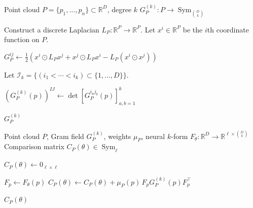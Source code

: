 \documentclass{article}
\theoremstyle{remark}
\theoremstyle{plain}
\begin{document}
\begin{algorithm}[H]
\caption{Gram field precomputation}
\label{alg:gram-field}
\begin{algorithmic}[1]
\Require Point cloud $P=\{p_1,\ldots,p_n\}\subset\mathbb{R}^D$, degree $k$
\Ensure $G_P^{(k)}:P\to\operatorname{Sym}_{\binom{D}{k}}$

\State Construct a discrete Laplacian $L_P:\mathbb{R}^P\to\mathbb{R}^P$.
\State Let $x^i\in\mathbb{R}^P$ be the $i$th coordinate function on $P$.

    \State $G_P^{ij}\gets
    \frac{1}{2}\left(
    x^i\odot L_Px^j+x^j\odot L_Px^i-L_P(x^i\odot x^j)
    \right)$
\EndFor

\State Let $\mathcal{I}_k=\{(i_1<\cdots<i_k)\subset\{1,\ldots,D\}\}$.

        \State $\left(G_P^{(k)}(p)\right)^{IJ}
        \gets
        \det\left[G_P^{i_a j_b}(p)\right]_{a,b=1}^k$
    \EndFor
\EndFor

\State \Return $G_P^{(k)}$
\end{algorithmic}
\end{algorithm}


\begin{algorithm}[H]
\caption{Comparison matrix forward pass}
\label{alg:comparison-matrix}
\begin{algorithmic}[1]
\Require Point cloud $P$, Gram field $G_P^{(k)}$, weights $\mu_P$, neural $k$-form $F_\theta:\mathbb{R}^D\to
\mathbb{R}^{\ell\times\binom{D}{k}}$
\Ensure Comparison matrix $C_P(\theta)\in\operatorname{Sym}_{\ell}$

\State $C_P(\theta)\gets 0_{\ell\times\ell}$

    \State $F_p\gets F_\theta(p)$
    \State $C_P(\theta)\gets C_P(\theta)
    +\mu_P(p)\,F_pG_P^{(k)}(p)F_p^\top$
\EndFor

\State \Return $C_P(\theta)$
\end{algorithmic}
\end{algorithm}
\end{document}
